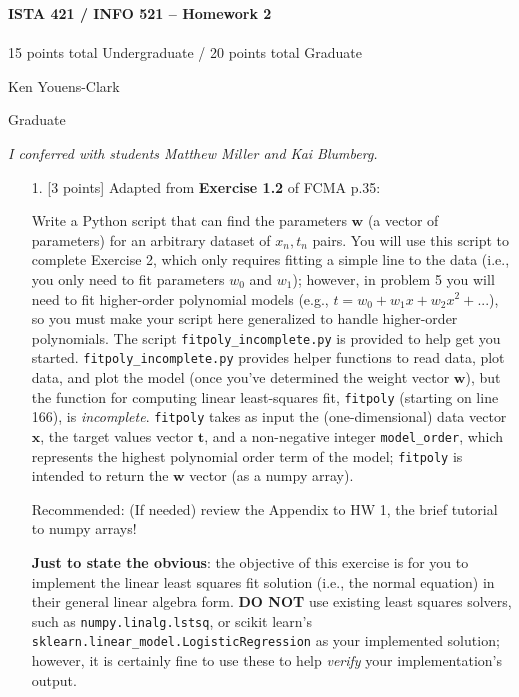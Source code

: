 \documentclass[10pt]{article}
\begin{document}
\begin{center}
    {\Large {\bf ISTA 421 / INFO 521 -- Homework 2}} \\
     \\
    15 points total Undergraduate / 20 points total Graduate

\end{center}

\begin{flushright}
Ken Youens-Clark 

Graduate
\end{flushright}

\emph{I conferred with students Matthew Miller and Kai Blumberg.}



\begin{itemize}



\item[1.] [3 points]
Adapted from {\bf Exercise 1.2} of FCMA p.35:

Write a Python script that can find the parameters $\mathbf{w}$ (a vector of parameters) for an arbitrary dataset of $x_n, t_n$ pairs.  You will use this script to complete Exercise 2, which only requires fitting a simple line to the data (i.e., you only need to fit parameters $w_0$ and $w_1$); however, in problem 5 you will need to fit higher-order polynomial models (e.g., $t = w_0 + w_1x + w_2x^2 + ...$), so you must make your script here generalized to handle higher-order polynomials.  The script {\tt fitpoly\_incomplete.py} is provided to help get you started.  {\tt fitpoly\_incomplete.py} provides helper functions to read data, plot data, and plot the model (once you've determined the weight vector $\mathbf{w}$), but the function for computing linear least-squares fit, {\tt fitpoly} (starting on line 166), is {\em incomplete}.  {\tt fitpoly} takes as input the (one-dimensional) data vector $\mathbf{x}$, the target values vector $\mathbf{t}$, and a non-negative integer {\tt model\_order}, which represents the highest polynomial order term of the model; {\tt fitpoly} is intended to return the $\mathbf{w}$ vector (as a numpy array).

Recommended: (If needed) review the Appendix to HW 1, the brief tutorial to numpy arrays!

{\bf Just to state the obvious}: the objective of this exercise is for you to implement the linear least squares fit solution (i.e., the normal equation) in their general linear algebra form.  {\bf DO NOT} use existing least squares solvers, such as {\tt numpy.linalg.lstsq}, or scikit learn's \\{\tt sklearn.linear\_model.LogisticRegression} as your implemented solution; however, it is certainly fine to use these to help {\em verify} your implementation's output.


\end{itemize}
\end{document}
